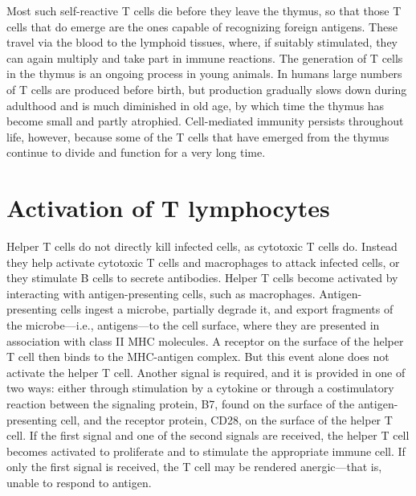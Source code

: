 Most such self-reactive T cells die before they leave the thymus, so that those T cells that do emerge are the ones capable of recognizing foreign antigens. These travel via the blood to the lymphoid tissues, where, if suitably stimulated, they can again multiply and take part in immune reactions. The generation of T cells in the thymus is an ongoing process in young animals. In humans large numbers of T cells are produced before birth, but production gradually slows down during adulthood and is much diminished in old age, by which time the thymus has become small and partly atrophied. Cell-mediated immunity persists throughout life, however, because some of the T cells that have emerged from the thymus continue to divide and function for a very long time.

\section{Activation of T lymphocytes}
Helper T cells do not directly kill infected cells, as cytotoxic T cells do. Instead they help activate cytotoxic T cells and macrophages to attack infected cells, or they stimulate B cells to secrete antibodies. Helper T cells become activated by interacting with antigen-presenting cells, such as macrophages. Antigen-presenting cells ingest a microbe, partially degrade it, and export fragments of the microbe—i.e., antigens—to the cell surface, where they are presented in association with class II MHC molecules. A receptor on the surface of the helper T cell then binds to the MHC-antigen complex. But this event alone does not activate the helper T cell. Another signal is required, and it is provided in one of two ways: either through stimulation by a cytokine or through a costimulatory reaction between the signaling protein, B7, found on the surface of the antigen-presenting cell, and the receptor protein, CD28, on the surface of the helper T cell. If the first signal and one of the second signals are received, the helper T cell becomes activated to proliferate and to stimulate the appropriate immune cell. If only the first signal is received, the T cell may be rendered anergic—that is, unable to respond to antigen.

